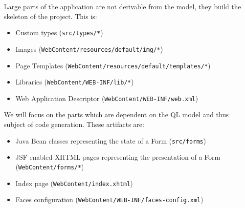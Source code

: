 Large parts of the application are not derivable from the model, they build the skeleton of the project. This is:
\begin{itemize}
\item Custom types (\texttt{src/types/*})
\item Images (\texttt{WebContent/resources/default/img/*})
\item Page Templates (\texttt{WebContent/resources/default/templates/*})
\item Libraries (\texttt{WebContent/WEB-INF/lib/*})
\item Web Application Descriptor (\texttt{WebContent/WEB-INF/web.xml})
\end{itemize}

We will focus on the parts which are dependent on the QL model and thus subject of code generation. These artifacts are:
\begin{itemize}
\item Java Bean classes representing the state of a Form (\texttt{src/forms})
\item JSF enabled XHTML pages representing the presentation of a Form (\texttt{WebContent/forms/*})
\item Index page (\texttt{WebContent/index.xhtml})
\item Faces configuration (\texttt{WebContent/WEB-INF/faces-config.xml})
\end{itemize}


